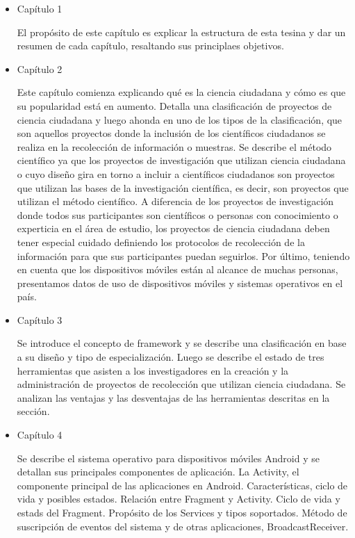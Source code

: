 \begin{itemize} 
	\item{Capítulo 1} 
		\begin{description}
		 El propósito de este capítulo es explicar la estructura de esta tesina y dar un resumen de cada capítulo, resaltando sus principlaes objetivos.
		\end{description}


	\item{Capítulo 2} 
		\begin{description} 
		Este capítulo comienza explicando qué es la ciencia ciudadana y cómo es que su popularidad está en aumento. Detalla una clasificación de proyectos de ciencia ciudadana y luego ahonda en uno de los tipos de la clasificación, que son aquellos proyectos donde la inclusión de los científicos ciudadanos se realiza en la recolección de información o muestras. Se describe el método científico ya que los proyectos de investigación que utilizan ciencia ciudadana o cuyo diseño gira en torno a incluir a científicos ciudadanos son proyectos que utilizan las bases de la investigación científica, es decir, son proyectos que utilizan el método científico. A diferencia de los proyectos de investigación donde todos sus participantes son científicos o personas con conocimiento o experticia en el área de estudio, los proyectos de ciencia ciudadana deben tener especial cuidado definiendo los protocolos de recolección de la información para que sus participantes puedan seguirlos. Por último, teniendo en cuenta que los dispositivos móviles están al alcance de muchas personas, presentamos datos de uso de dispositivos móviles y sistemas operativos en el país.
		\end{description}
	
	\item{Capítulo 3} 
		\begin{description} 
		Se introduce el concepto de framework y se describe una clasificación en base a su diseño y tipo de especialización. Luego se describe el estado de tres herramientas que asisten a los investigadores en la creación y la administración de proyectos de recolección que utilizan ciencia ciudadana. Se analizan las ventajas y las desventajas de las herramientas descritas en la sección.
		\end{description}
	
	\item{Capítulo 4} 
		\begin{description} 
		Se describe el sistema operativo para dispositivos móviles Android y se detallan sus principales componentes de aplicación. La Activity, el componente principal de las aplicaciones en Android. Características, ciclo de vida y posibles estados. Relación entre Fragment y Activity. Ciclo de vida y estads del Fragment. Propósito de los Services y tipos soportados. Método de suscripción de eventos del sistema y de otras aplicaciones, BroadcastReceiver. 
		\end{description} 


\end{itemize}
